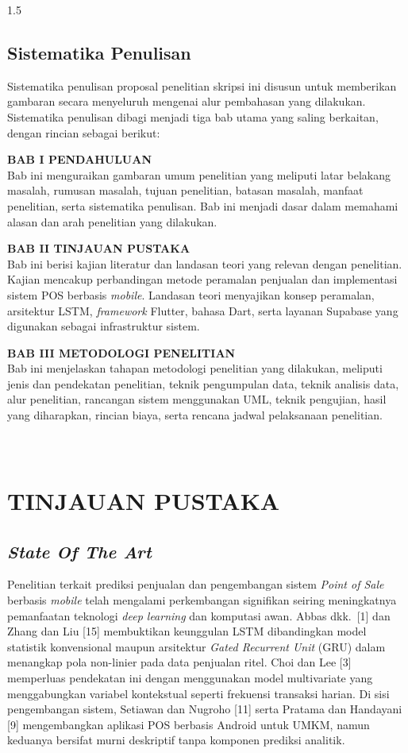 \documentclass[12pt, a4paper, onecolumn, oneside]{report}
\begin{document}
\begin{spacing}{1.5}
\section{Sistematika Penulisan}
Sistematika penulisan proposal penelitian skripsi ini disusun untuk memberikan gambaran secara menyeluruh mengenai alur pembahasan yang dilakukan. Sistematika penulisan dibagi menjadi tiga bab utama yang saling berkaitan, dengan rincian sebagai berikut:

\noindent\textbf{BAB I PENDAHULUAN}\\
Bab ini menguraikan gambaran umum penelitian yang meliputi latar belakang masalah, rumusan masalah, tujuan penelitian, batasan masalah, manfaat penelitian, serta sistematika penulisan. Bab ini menjadi dasar dalam memahami alasan dan arah penelitian yang dilakukan.

\noindent\textbf{BAB II TINJAUAN PUSTAKA}\\
Bab ini berisi kajian literatur dan landasan teori yang relevan dengan penelitian. Kajian mencakup perbandingan metode peramalan penjualan dan implementasi sistem POS berbasis \textit{mobile}. Landasan teori menyajikan konsep peramalan, arsitektur LSTM, \textit{framework} Flutter, bahasa Dart, serta layanan Supabase yang digunakan sebagai infrastruktur sistem.

\noindent\textbf{BAB III METODOLOGI PENELITIAN}\\
Bab ini menjelaskan tahapan metodologi penelitian yang dilakukan, meliputi jenis dan pendekatan penelitian, teknik pengumpulan data, teknik analisis data, alur penelitian, rancangan sistem menggunakan UML, teknik pengujian, hasil yang diharapkan, rincian biaya, serta rencana jadwal pelaksanaan penelitian.

\chapter[TINJAUAN PUSTAKA]{\\ TINJAUAN PUSTAKA}

\section{\textit{State Of The Art}}

Penelitian terkait prediksi penjualan dan pengembangan sistem \textit{Point of Sale} berbasis \textit{mobile} telah mengalami perkembangan signifikan seiring meningkatnya pemanfaatan teknologi \textit{deep learning} dan komputasi awan. Abbas dkk.~[1] dan Zhang dan Liu [15] membuktikan keunggulan LSTM dibandingkan model statistik konvensional maupun arsitektur \textit{Gated Recurrent Unit} (GRU) dalam menangkap pola non-linier pada data penjualan ritel. Choi dan Lee [3] memperluas pendekatan ini dengan menggunakan model multivariate yang menggabungkan variabel kontekstual seperti frekuensi transaksi harian. Di sisi pengembangan sistem, Setiawan dan Nugroho [11] serta Pratama dan Handayani [9] mengembangkan aplikasi POS berbasis Android untuk UMKM, namun keduanya bersifat murni deskriptif tanpa komponen prediksi analitik.


\end{spacing}
\end{document}
